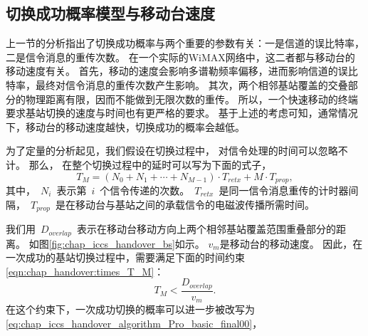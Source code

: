 \subsection{切换成功概率模型与移动台速度}
上一节的分析指出了切换成功概率与两个重要的参数有关：一是信道的误比特率，二是信令消息的重传次数。
在一个实际的WiMAX网络中，这二者都与移动台的移动速度有关。
首先，移动的速度会影响多谱勒频率偏移，进而影响信道的误比特率，最终对信令消息的重传次数产生影响。
其次，两个相邻基站覆盖的交叠部分的物理距离有限，因而不能做到无限次数的重传。
所以，一个快速移动的终端要求基站切换的速度与时间也有更严格的要求。
基于上述的考虑可知，通常情况下，移动台的移动速度越快，切换成功的概率会越低。

为了定量的分析起见，我们假设在切换过程中，
对信令处理的时间可以忽略不计。
那么，
在整个切换过程中的延时可以写为下面的式子，
$$
T_{M}=(N_{0}+N_{1}+\cdots+N_{M-1})\cdot T_{retx}+M\cdot T_{prop},
$$
其中，~$N_i$~表示第~$i$~个信令传递的次数。~$T_{retx}$~是同一信令消息重传的计时器间隔，~$T_{prop}$~是在移动台与基站之间的承载信令的电磁波传播所需时间。

我们用~$D_{overlap}$~表示在移动台移动方向上两个相邻基站覆盖范围重叠部分的距离。
如图\ref{fig:chap_iccs_handover_bs}如示。
$v_m$是移动台的移动速度。
因此，在一次成功的基站切换过程中，需要满足下面的时间约束\eqref{eqn:chap_handover:times_T_M}：
\begin{equation}
T_{M}<\frac{D_{overlap}}{v_{m}}.
\label{eqn:chap_handover:times_T_M}
\end{equation}
在这个约束下，一次成功切换的概率可以进一步被改写为\eqref{eq:chap_iccs_handover_algorithm_Pro_basic_final00}，

